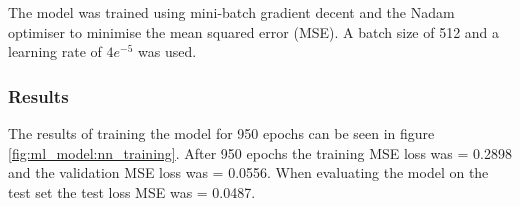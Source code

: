 The model was trained using mini-batch gradient decent and the Nadam optimiser to minimise the mean squared error (MSE). A batch size of 512 and a learning rate of $4e^{-5}$ was used.


\subsubsection{Results}
\FloatBarrier


The results of training the model for 950 epochs can be seen in figure \ref{fig:ml_model:nn_training}. After 950 epochs the training MSE loss was = 0.2898 and the validation MSE loss was = 0.0556. When evaluating the model on the test set the test loss MSE was = 0.0487. 

